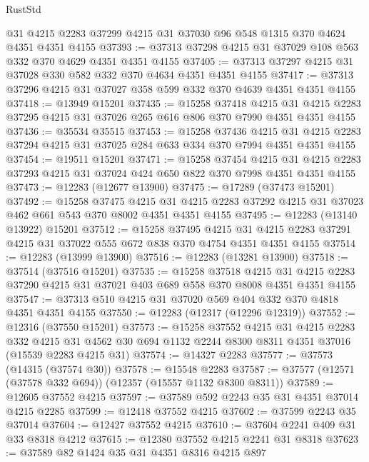 \begin{lexlean}{RustStd}
\begin{coremodule}
    @31
    @4215
    @2283
    @37299
    @4215
    @31
    @37030
    @96
    @548
    @1315
    @370
    @4624
    @4351
    @4351
    @4155
@37393 := @37313 @37298 @4215 @31 @37029 @108 @563 @332 @370 @4629 @4351 @4351 @4155
@37405 := @37313 @37297 @4215 @31 @37028 @330 @582 @332 @370 @4634 @4351 @4351 @4155
@37417 := @37313 @37296 @4215 @31 @37027 @358 @599 @332 @370 @4639 @4351 @4351 @4155
@37418 := @13949 @15201
@37435 := @15258
    @37418
    @4215
    @31
    @4215
    @2283
    @37295
    @4215
    @31
    @37026
    @265
    @616
    @806
    @370
    @7990
    @4351
    @4351
    @4155
@37436 := @35534 @35515
@37453 := @15258
    @37436
    @4215
    @31
    @4215
    @2283
    @37294
    @4215
    @31
    @37025
    @284
    @633
    @334
    @370
    @7994
    @4351
    @4351
    @4155
@37454 := @19511 @15201
@37471 := @15258
    @37454
    @4215
    @31
    @4215
    @2283
    @37293
    @4215
    @31
    @37024
    @424
    @650
    @822
    @370
    @7998
    @4351
    @4351
    @4155
@37473 := @12283 (@12677 @13900)
@37475 := @17289 (@37473 @15201)
@37492 := @15258
    @37475
    @4215
    @31
    @4215
    @2283
    @37292
    @4215
    @31
    @37023
    @462
    @661
    @543
    @370
    @8002
    @4351
    @4351
    @4155
@37495 := @12283 (@13140 @13922) @15201
@37512 := @15258
    @37495
    @4215
    @31
    @4215
    @2283
    @37291
    @4215
    @31
    @37022
    @555
    @672
    @838
    @370
    @4754
    @4351
    @4351
    @4155
@37514 := @12283 (@13999 @13900)
@37516 := @12283 (@13281 @13900)
@37518 := @37514 (@37516 @15201)
@37535 := @15258
    @37518
    @4215
    @31
    @4215
    @2283
    @37290
    @4215
    @31
    @37021
    @403
    @689
    @558
    @370
    @8008
    @4351
    @4351
    @4155
@37547 := @37313 @510 @4215 @31 @37020 @569 @404 @332 @370 @4818 @4351 @4351 @4155
@37550 := @12283 (@12317 (@12296 @12319))
@37552 := @12316 (@37550 @15201)
@37573 := @15258
    @37552
    @4215
    @31
    @4215
    @2283
    @332
    @4215
    @31
    @4562
    @30
    @694
    @1132
    @2244
    @8300
    @8311
    @4351
    @37016
    (@15539 @2283 @4215 @31)
@37574 := @14327 @2283
@37577 := @37573 (@14315 (@37574 @30))
@37578 := @15548 @2283
@37587 := @37577 (@12571 (@37578 @332 @694)) (@12357 (@15557 @1132 @8300 @8311))
@37589 := @12605 @37552 @4215
@37597 := @37589 @592 @2243 @35 @31 @4351 @37014 @4215 @2285
@37599 := @12418 @37552 @4215
@37602 := @37599 @2243 @35 @37014
@37604 := @12427 @37552 @4215
@37610 := @37604 @2241 @409 @31 @33 @8318 @4212
@37615 := @12380 @37552 @4215 @2241 @31 @8318
@37623 := @37589 @82 @1424 @35 @31 @4351 @8316 @4215 @897

\end{coremodule}
\end{lexlean}
